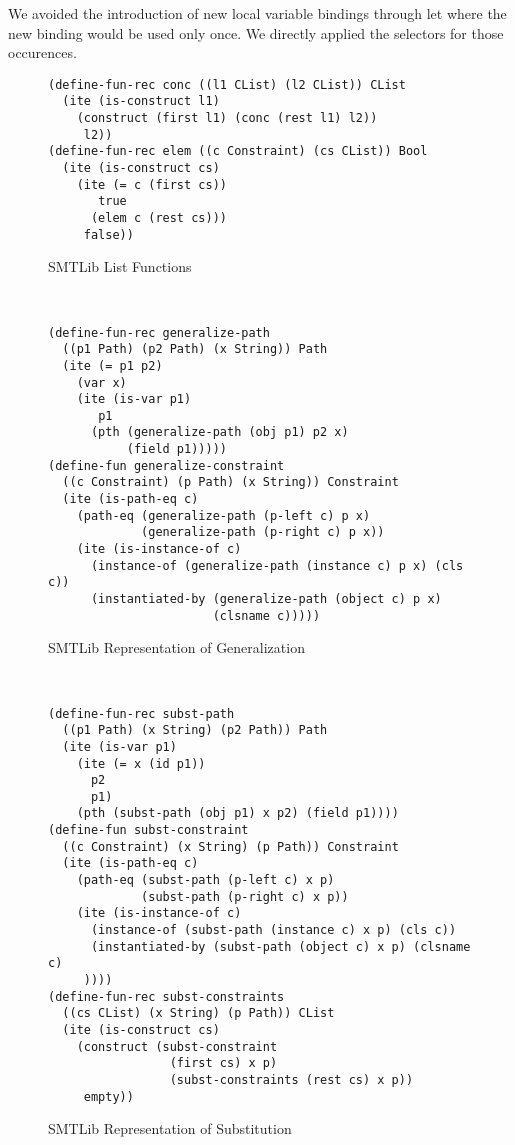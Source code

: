 We avoided the introduction of new local variable bindings
through let where the new binding would be used only once.
We directly applied the selectors for those occurences.
%
\begin{figure}[t]
\begin{lstlisting}[language=smtlib]
(define-fun-rec conc ((l1 CList) (l2 CList)) CList
  (ite (is-construct l1)
    (construct (first l1) (conc (rest l1) l2))
     l2))
(define-fun-rec elem ((c Constraint) (cs CList)) Bool
  (ite (is-construct cs)
    (ite (= c (first cs))
       true
      (elem c (rest cs)))
     false))
\end{lstlisting}
\caption{SMTLib List Functions}
\label{fig:smtlib-funs-list}
\end{figure}\\
%
\begin{figure}[h]
\begin{lstlisting}[language=smtlib]
(define-fun-rec generalize-path
  ((p1 Path) (p2 Path) (x String)) Path
  (ite (= p1 p2)
    (var x)
    (ite (is-var p1)
       p1
      (pth (generalize-path (obj p1) p2 x)
           (field p1)))))
(define-fun generalize-constraint
  ((c Constraint) (p Path) (x String)) Constraint
  (ite (is-path-eq c)
    (path-eq (generalize-path (p-left c) p x)
             (generalize-path (p-right c) p x))
    (ite (is-instance-of c)
      (instance-of (generalize-path (instance c) p x) (cls c))
      (instantiated-by (generalize-path (object c) p x)
                       (clsname c)))))
\end{lstlisting}
\caption{SMTLib Representation of Generalization}
\label{fig:smtlib-funs-gen}
\end{figure}\\
%
\begin{figure}[t]
\begin{lstlisting}[language=smtlib]
(define-fun-rec subst-path
  ((p1 Path) (x String) (p2 Path)) Path
  (ite (is-var p1)
    (ite (= x (id p1))
      p2
      p1)
    (pth (subst-path (obj p1) x p2) (field p1))))
(define-fun subst-constraint
  ((c Constraint) (x String) (p Path)) Constraint
  (ite (is-path-eq c)
    (path-eq (subst-path (p-left c) x p)
             (subst-path (p-right c) x p))
    (ite (is-instance-of c)
      (instance-of (subst-path (instance c) x p) (cls c))
      (instantiated-by (subst-path (object c) x p) (clsname c)
     ))))
(define-fun-rec subst-constraints
  ((cs CList) (x String) (p Path)) CList
  (ite (is-construct cs)
    (construct (subst-constraint
                 (first cs) x p)
                 (subst-constraints (rest cs) x p))
     empty))
\end{lstlisting}
\caption{SMTLib Representation of Substitution}
\label{fig:smtlib-funs-subst}
\end{figure}
